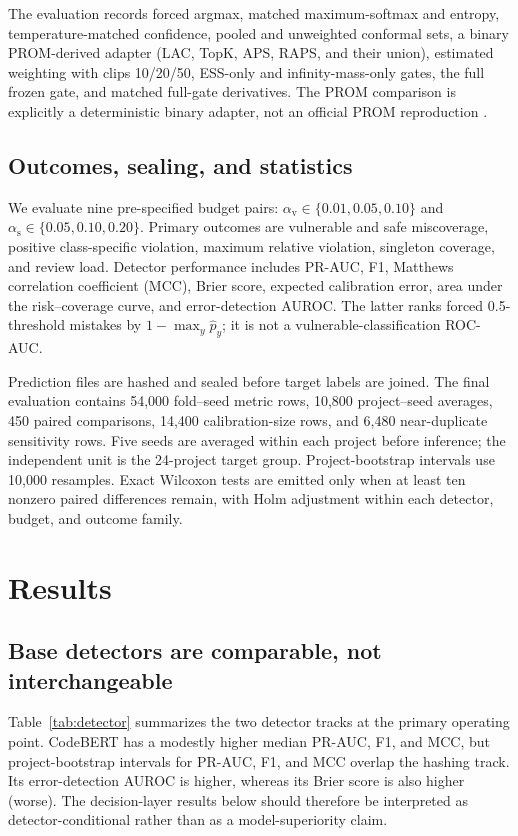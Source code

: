 \documentclass[preprint,12pt]{elsarticle}
\newcommand{\av}{\alpha_{\mathrm{v}}}
\newcommand{\as}{\alpha_{\mathrm{s}}}
\begin{document}
The evaluation records forced argmax, matched maximum-softmax and entropy, temperature-matched confidence, pooled and unweighted conformal sets, a binary PROM-derived adapter (LAC, TopK, APS, RAPS, and their union), estimated weighting with clips 10/20/50, ESS-only and infinity-mass-only gates, the full frozen gate, and matched full-gate derivatives. The PROM comparison is explicitly a deterministic binary adapter, not an official PROM reproduction \cite{wang2025prom}.

\subsection{Outcomes, sealing, and statistics}

We evaluate nine pre-specified budget pairs: $\av\in\{0.01,0.05,0.10\}$ and $\as\in\{0.05,0.10,0.20\}$. Primary outcomes are vulnerable and safe miscoverage, positive class-specific violation, maximum relative violation, singleton coverage, and review load. Detector performance includes PR-AUC, F1, Matthews correlation coefficient (MCC), Brier score, expected calibration error, area under the risk--coverage curve, and error-detection AUROC. The latter ranks forced 0.5-threshold mistakes by $1-\max_y\widehat p_y$; it is not a vulnerable-classification ROC-AUC.

Prediction files are hashed and sealed before target labels are joined. The final evaluation contains 54,000 fold--seed metric rows, 10,800 project--seed averages, 450 paired comparisons, 14,400 calibration-size rows, and 6,480 near-duplicate sensitivity rows. Five seeds are averaged within each project before inference; the independent unit is the 24-project target group. Project-bootstrap intervals use 10,000 resamples. Exact Wilcoxon tests are emitted only when at least ten nonzero paired differences remain, with Holm adjustment within each detector, budget, and outcome family.

\section{Results}

\subsection{Base detectors are comparable, not interchangeable}

Table~\ref{tab:detector} summarizes the two detector tracks at the primary operating point. CodeBERT has a modestly higher median PR-AUC, F1, and MCC, but project-bootstrap intervals for PR-AUC, F1, and MCC overlap the hashing track. Its error-detection AUROC is higher, whereas its Brier score is also higher (worse). The decision-layer results below should therefore be interpreted as detector-conditional rather than as a model-superiority claim.
\end{document}

